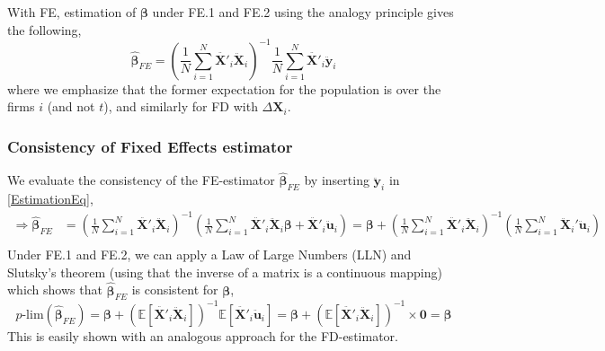With FE, estimation of $\pmb{\beta}$ under FE.1 and FE.2 using the analogy principle gives the following,
\begin{equation} \label{EstimationEq}
    \pmb{\hat{\beta}}_{FE}= \left( \frac{1}{N} \sum_{i=1}^N {\pmb{\ddot{X'}}_{i} \pmb{\ddot{X}}_{i} } \right) ^{-1}\frac{1}{N} \sum_{i=1}^N {\pmb{\ddot{X'}}_{i} \pmb{\ddot{y}}_{i} }
\end{equation}
where we emphasize that the former expectation for the population is over the firms $i$ (and not $t$), and similarly for FD with $\Delta \pmb{X}_i$. 


\subsubsection*{Consistency of Fixed Effects estimator}
We evaluate the consistency of the FE-estimator $\pmb{\hat{\beta}}_{FE}$ by inserting $\pmb{\ddot{y}}_i$ in \eqref{EstimationEq},
\begin{align} 
    \Rightarrow \pmb{\hat{\beta}}_{FE} &= \left( \frac{1}{N} \sum_{i=1}^N {\pmb{\ddot{X'}}_{i} \pmb{\ddot{X}}_{i} } \right) ^{-1} \left(\frac{1}{N} \sum_{i=1}^N {\pmb{\ddot{X'}}_{i}}\pmb{\ddot{X}}_{i} \pmb{\beta}+\pmb{\ddot{X'}}_{i}\pmb{\ddot{u}}_i \right) \nonumber = \pmb{\beta} +\left( \frac{1}{N} \sum_{i=1}^N {\pmb{\ddot{X'}}_{i} \pmb{\ddot{X}}_{i} } \right) ^{-1} \left( \frac{1}{N} \sum_{i=1}^N {\pmb{\ddot{X}}_i' \pmb{\ddot{u}}_i} \right) \\ \label{FE-estimator}
\end{align}
Under FE.1 and FE.2, we can apply a Law of Large Numbers (LLN) and Slutsky's theorem (using that the inverse of a matrix is a continuous mapping) which shows that $\pmb{\hat{\beta}}_{FE}$ is consistent for $\pmb{\beta}$,
$$p\text{-lim}(\pmb{\hat{\beta}}_{FE})=\pmb{\beta} + \left( \mathbb{E}[\ddot{\pmb{X'}}_i \ddot{\pmb{X}}_i] \right)^{-1}\mathbb{E}[\ddot{\pmb{X'}}_i \ddot{\pmb{u}}_i]=\pmb{\beta} + \left( \mathbb{E}[\ddot{\pmb{X'}}_i \ddot{\pmb{X}}_i] \right)^{-1}\times\pmb{0} =\pmb{\beta}$$
This is easily shown with an analogous approach for the FD-estimator.

